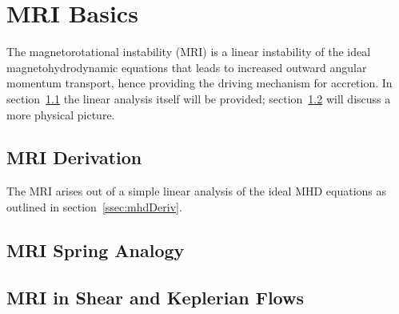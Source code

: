 \section{MRI Basics}
The magnetorotational instability (MRI) is a linear instability of the ideal magnetohydrodynamic equations that leads to increased outward angular momentum transport, hence providing the driving mechanism for accretion. In section~\ref{ssec:mriDeriv} the linear analysis itself will be provided; section~\ref{ssec:mriSpring} will discuss a more physical picture.


\subsection{MRI Derivation}\label{ssec:mriDeriv}
The MRI arises out of a simple linear analysis of the ideal MHD equations as outlined in section~\ref{ssec:mhdDeriv}. 



\subsection{MRI Spring Analogy}\label{ssec:mriSpring}

\subsection{MRI in Shear and Keplerian Flows}\label{ssec:mriFlows}

